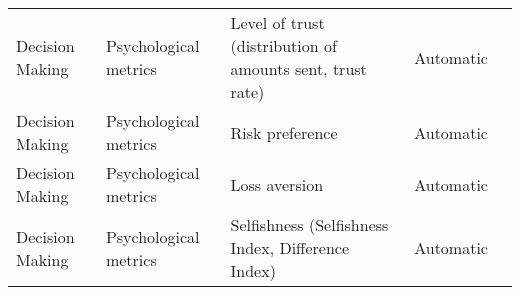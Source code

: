 \begin{small}
\begin{center}
\begin{longtable}{@{}p{}p{}p{}p{}p{}@{}}
Decision Making          & Psychological metrics & Level of trust (distribution of amounts sent, trust rate)                                                                                                                                                   & Automatic & \cite{Xie2024CanLL}                                                                                                                                                                                                                                                                                                                                                                                                      \\
Decision Making          & Psychological metrics & Risk preference                                                                                                                                                                                             & Automatic & \cite{Jia2024DecisionMakingBE}                                                                                                                                                                                                                                                                                                                                                                                                      \\
Decision Making          & Psychological metrics & Loss aversion                                                                                                                                                                                               & Automatic & \cite{Jia2024DecisionMakingBE}                                                                                                                                                                                                                                                                                                                                                                                                      \\
Decision Making          & Psychological metrics & Selfishness (Selfishness Index, Difference Index)                                                                                                                                                           & Automatic & \cite{Kim2024WillLS}                                                                                                                                                                                                                                                                                                                                                                               \\

\end{longtable}
\end{center}
\end{small}
